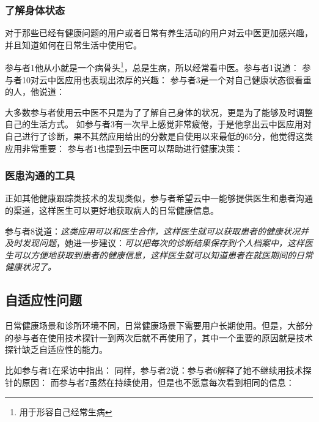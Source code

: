 \subsubsection{了解身体状态}

对于那些已经有健康问题的用户或者日常有养生活动的用户对云中医更加感兴趣，并且知道如何在日常生活中使用它。

参与者1他从小就是一个病骨头\footnote{用于形容自己经常生病}，总是生病，所以经常看中医。参与者1说道：
参与者10对云中医应用也表现出浓厚的兴趣：
参与者3是一个对自己健康状态很看重的人，他说道：

大多数参与者使用云中医不只是为了了解自己身体的状况，更是为了能够及时调整自己的生活方式。
如参与者3有一次早上感觉非常疲倦，于是他拿出云中医应用对自己进行了诊断，果不其然应用给出的分数是自使用以来最低的65分，他觉得这类应用非常重要：
参与者1也提到云中医可以帮助进行健康决策：

\subsubsection{医患沟通的工具}

正如其他健康跟踪类技术的发现类似，参与者希望云中一能够提供医生和患者沟通的渠道，这样医生可以更好地获取病人的日常健康信息。

参与者8说道：\textit{这类应用可以和医生合作，这样医生就可以获取患者的健康状况并及时发现问题}，她进一步建议：\textit{可以把每次的诊断结果保存到个人档案中，这样医生可以方便地获取到患者的健康信息，这样医生就可以知道患者在就医期间的日常健康状况了。}


\subsection{自适应性问题}

日常健康场景和诊所环境不同，日常健康场景下需要用户长期使用。但是，大部分的参与者在使用技术探针一到两次后就不再使用了，其中一个重要的原因就是技术探针缺乏自适应性的能力。

比如参与者1在采访中指出：
同样，参与者2说：参与者6解释了她不继续用技术探针的原因：
而参与者7虽然在持续使用，但是也不愿意每次看到相同的信息：

